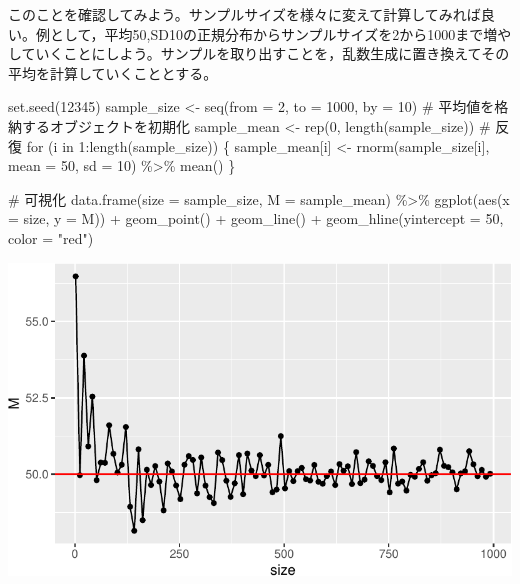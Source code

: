\documentclass[
  a4paper,
]{ltjsbook}
\newenvironment{Shaded}{\begin{snugshade}}{\end{snugshade}}
\newcommand{\AttributeTok}[1]{\textcolor[rgb]{0.40,0.45,0.13}{#1}}
\newcommand{\CommentTok}[1]{\textcolor[rgb]{0.37,0.37,0.37}{#1}}
\newcommand{\ControlFlowTok}[1]{\textcolor[rgb]{0.00,0.23,0.31}{#1}}
\newcommand{\DecValTok}[1]{\textcolor[rgb]{0.68,0.00,0.00}{#1}}
\newcommand{\FunctionTok}[1]{\textcolor[rgb]{0.28,0.35,0.67}{#1}}
\newcommand{\NormalTok}[1]{\textcolor[rgb]{0.00,0.23,0.31}{#1}}
\newcommand{\OtherTok}[1]{\textcolor[rgb]{0.00,0.23,0.31}{#1}}
\newcommand{\SpecialCharTok}[1]{\textcolor[rgb]{0.37,0.37,0.37}{#1}}
\newcommand{\StringTok}[1]{\textcolor[rgb]{0.13,0.47,0.30}{#1}}
\begin{document}
このことを確認してみよう。サンプルサイズを様々に変えて計算してみれば良い。例として，平均50,SD10の正規分布からサンプルサイズを2から1000まで増やしていくことにしよう。サンプルを取り出すことを，乱数生成に置き換えてその平均を計算していくこととする。

\begin{Shaded}
\begin{Highlighting}[]
\FunctionTok{set.seed}\NormalTok{(}\DecValTok{12345}\NormalTok{)}
\NormalTok{sample\_size }\OtherTok{\textless{}{-}} \FunctionTok{seq}\NormalTok{(}\AttributeTok{from =} \DecValTok{2}\NormalTok{, }\AttributeTok{to =} \DecValTok{1000}\NormalTok{, }\AttributeTok{by =} \DecValTok{10}\NormalTok{)}
\CommentTok{\# 平均値を格納するオブジェクトを初期化}
\NormalTok{sample\_mean }\OtherTok{\textless{}{-}} \FunctionTok{rep}\NormalTok{(}\DecValTok{0}\NormalTok{, }\FunctionTok{length}\NormalTok{(sample\_size))}
\CommentTok{\# 反復}
\ControlFlowTok{for}\NormalTok{ (i }\ControlFlowTok{in} \DecValTok{1}\SpecialCharTok{:}\FunctionTok{length}\NormalTok{(sample\_size)) \{}
\NormalTok{  sample\_mean[i] }\OtherTok{\textless{}{-}} \FunctionTok{rnorm}\NormalTok{(sample\_size[i], }\AttributeTok{mean =} \DecValTok{50}\NormalTok{, }\AttributeTok{sd =} \DecValTok{10}\NormalTok{) }\SpecialCharTok{\%\textgreater{}\%}
    \FunctionTok{mean}\NormalTok{()}
\NormalTok{\}}

\CommentTok{\# 可視化}
\FunctionTok{data.frame}\NormalTok{(}\AttributeTok{size =}\NormalTok{ sample\_size, }\AttributeTok{M =}\NormalTok{ sample\_mean) }\SpecialCharTok{\%\textgreater{}\%}
  \FunctionTok{ggplot}\NormalTok{(}\FunctionTok{aes}\NormalTok{(}\AttributeTok{x =}\NormalTok{ size, }\AttributeTok{y =}\NormalTok{ M)) }\SpecialCharTok{+}
  \FunctionTok{geom\_point}\NormalTok{() }\SpecialCharTok{+}
  \FunctionTok{geom\_line}\NormalTok{() }\SpecialCharTok{+}
  \FunctionTok{geom\_hline}\NormalTok{(}\AttributeTok{yintercept =} \DecValTok{50}\NormalTok{, }\AttributeTok{color =} \StringTok{"red"}\NormalTok{)}
\end{Highlighting}
\end{Shaded}

\includegraphics{chapter06_files/figure-pdf/consistency-1.pdf}
\end{document}
